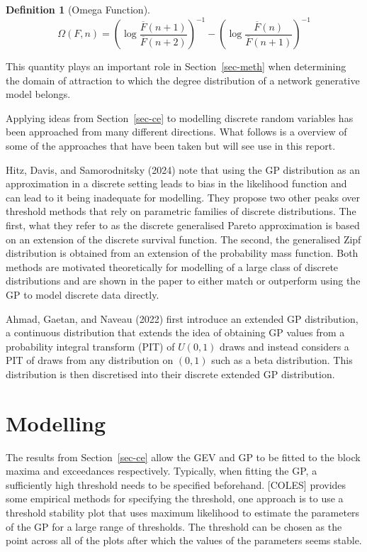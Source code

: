 \documentclass[
  10pt,
  a4paper,
]{scrreprt}
\theoremstyle{definition}
\newtheorem{definition}{Definition}[section]
\theoremstyle{plain}
\theoremstyle{remark}
\begin{document}
{\begin{definition}[Omega
Function]
\[
\Omega(F,n) = \left(\log\displaystyle\frac{\overline F (n+1)}{\overline F (n+2)}\right)^{-1} - \left(\log\displaystyle\frac{\overline F (n)}{\overline F (n+1)}\right)^{-1}
\]

\end{definition}

This quantity plays an important role in Section~\ref{sec-meth} when
determining the domain of attraction to which the degree distribution of
a network generative model belongs.

Applying ideas from Section~\ref{sec-ce} to modelling discrete random
variables has been approached from many different directions. What
follows is a overview of some of the approaches that have been taken but
will see use in this report.

Hitz, Davis, and Samorodnitsky (2024) note that using the GP
distribution as an approximation in a discrete setting leads to bias in
the likelihood function and can lead to it being inadequate for
modelling. They propose two other peaks over threshold methods that rely
on parametric families of discrete distributions. The first, what they
refer to as the discrete generalised Pareto approximation is based on an
extension of the discrete survival function. The second, the generalised
Zipf distribution is obtained from an extension of the probability mass
function. Both methods are motivated theoretically for modelling of a
large class of discrete distributions and are shown in the paper to
either match or outperform using the GP to model discrete data directly.

Ahmad, Gaetan, and Naveau (2022) first introduce an extended GP
distribution, a continuous distribution that extends the idea of
obtaining GP values from a probability integral transform (PIT) of
\(U(0,1)\) draws and instead considers a PIT of draws from any
distribution on \((0,1)\) such as a beta distribution. This distribution
is then discretised into their discrete extended GP distribution.

\hypertarget{sec-mod}{%
\section{Modelling}\label{sec-mod}}

The results from Section~\ref{sec-ce} allow the GEV and GP to be fitted
to the block maxima and exceedances respectively. Typically, when
fitting the GP, a sufficiently high threshold needs to be specified
beforehand. {[}COLES{]} provides some empirical methods for specifying
the threshold, one approach is to use a threshold stability plot that
uses maximum likelihood to estimate the parameters of the GP for a large
range of thresholds. The threshold can be chosen as the point across all
of the plots after which the values of the parameters seems stable.

}
\end{document}
